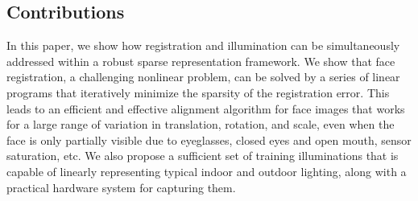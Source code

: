 \documentclass[10pt,journal,letterpaper,compsoc]{IEEEtran} %
\begin{document}
\subsection{Contributions} In this paper, we show how
registration and illumination
can be simultaneously addressed within a robust sparse representation
framework. We show that face registration, a challenging
nonlinear problem, can be solved by a series of linear programs
that iteratively minimize the sparsity of the registration
error. This leads to an efficient and effective alignment
algorithm for face images that works for a large range of
variation in translation, rotation, and scale, even when
the face is only partially visible due to eyeglasses, closed
eyes and open mouth, sensor saturation, etc.  We also propose a
sufficient set of training illuminations
that is capable of linearly representing typical indoor and outdoor
lighting, along with a practical hardware system for capturing
them.




\end{document}
